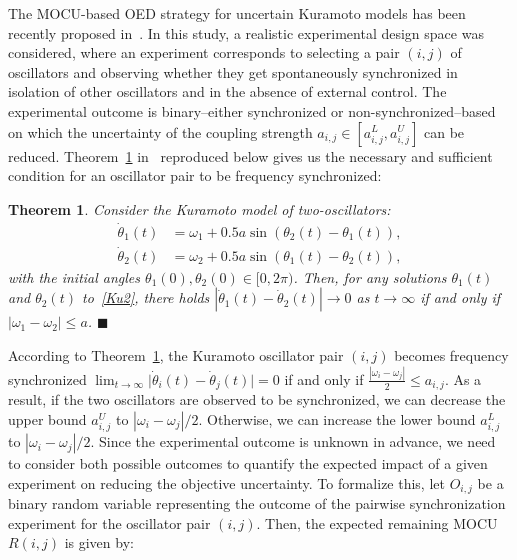 \documentclass{article}
\newtheorem{thm}{Theorem}
\begin{document}
The MOCU-based OED strategy for uncertain Kuramoto models has been recently proposed in~\cite{Hong2021}. In this study, a realistic experimental design space was considered, where an experiment corresponds to selecting a pair $\left(i,j\right)$ of oscillators and observing whether they get spontaneously synchronized in isolation of other oscillators and in the absence of external control. The experimental outcome is binary--either synchronized or non-synchronized--based on which the uncertainty of the coupling strength $a_{i,j} \in [a^L_{i, j}, a^U_{i, j}]$ can be reduced. Theorem~\ref{theo:sync} in~\cite{Hong2021} reproduced below gives us the necessary and sufficient condition for an oscillator pair to be frequency synchronized:
\begin{thm} \label{theo:sync}
Consider the Kuramoto model of two-oscillators:
\begin{equation}\label{Ku2}
\begin{split}
\dot \theta_1 \left(t\right)&= \omega_1 + 0.5a \sin\left(\theta_2\left(t\right)- \theta_1\left(t\right)\right),\\
\dot \theta_2 \left(t\right)&= \omega_2 + 0.5a \sin\left(\theta_1\left(t\right) - \theta_2\left(t\right)\right),
\end{split}
\end{equation}
with the initial angles $\theta_1\left(0\right), \theta_2\left(0\right)\in[0,2\pi)$.
Then, for any solutions  $\theta_1 \left(t\right)$ and $\theta_2\left(t\right)$ to~\eqref{Ku2}, there holds 
$|\dot\theta_1(t) - \dot\theta_2(t) | \to 0$ as $t\to\infty$ 
if and only if 
$|\omega_1-\omega_2|\le a$. \hspace{3.6in} $\blacksquare$
\end{thm}
According to Theorem~\ref{theo:sync}, the Kuramoto oscillator pair $\left(i,j\right)$ becomes frequency synchronized $\lim_{t \to \infty}\lvert \dot{\theta}_i \left(t\right) - \dot{\theta}_j \left(t\right)\rvert = 0$ if and only if $\frac{\left\lvert\omega_i - \omega_j \right\rvert}{2} \leq a_{i,j}$. As a result, if the two oscillators are observed to be synchronized, we can decrease the upper bound ${a^U_{i, j}}$ to ${{\left\lvert\omega_i - \omega_j \right\rvert}/{2}}$. Otherwise, we can increase the lower bound ${a^L_{i, j}}$ to ${{\left\lvert\omega_i - \omega_j \right\rvert}/{2}}$. Since the experimental outcome is unknown in advance, we need to consider both possible outcomes to quantify the expected impact of a given experiment on reducing the objective uncertainty. To formalize this, let ${O_{i, j}}$ be a binary random variable representing the outcome of the pairwise synchronization experiment for the oscillator pair $\left(i,j\right)$. Then, the expected remaining MOCU ${R\left(i, j\right)}$ is given by:
\end{document}
